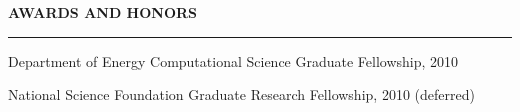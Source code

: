 \documentclass[letterpaper,10pt]{article}
\newenvironment{itemize*}
  {\begin{itemize}
    \setlength{\parskip}{-3pt}}
  {\end{itemize}}
\newcommand{\cvheading}[1]{
\vspace{0.05in}
\noindent
\MakeUppercase{\bf #1}
\vspace{0.06in}
{\hrule height 0.3mm}
\vspace{0.06in}}
\begin{document}
\cvheading{Awards and Honors}
\noindent
\begin{itemize*}
\item Department of Energy Computational Science Graduate Fellowship, 2010 
\item National Science Foundation Graduate Research Fellowship, 2010 (deferred)
\end{itemize*}

\end{document}
